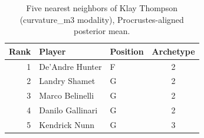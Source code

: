 \begin{table}[htbp]
  \centering\small
  \begin{tabular}{rllc}
    \toprule
    Rank & Player & Position & Archetype \\
    \midrule
    1 & De'Andre Hunter & F & 2 \\
    2 & Landry Shamet & G & 2 \\
    3 & Marco Belinelli & G & 2 \\
    4 & Danilo Gallinari & G & 2 \\
    5 & Kendrick Nunn & G & 3 \\
    \bottomrule
  \end{tabular}
  \caption{Five nearest neighbors of Klay Thompson (curvature_m3 modality), Procrustes-aligned posterior mean.}
  \label{tab:Klay_Thompson_neighbors_curvature_m3}
\end{table}


